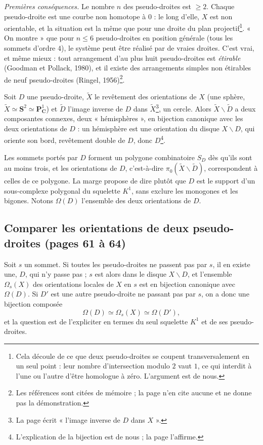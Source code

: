 \documentclass[11pt,a4paper]{article}
\begin{document}
\emph{Premières conséquences.} Le nombre $n$ des pseudo-droites est
$\geqslant 2$. Chaque pseudo-droite est une courbe non homotope à $0$ : le
long d'elle, $X$ est non orientable, et la situation est la même que pour
une droite du plan projectif\footnote{Cela découle de ce que deux
pseudo-droites se coupent transversalement en un seul point : leur nombre
d'intersection modulo $2$ vaut $1$, ce qui interdit à l'une ou l'autre
d'être homologue à zéro. L'argument est de nous.}. « On montre » que pour
$n \leqslant 6$ pseudo-droites en position générale (tous les sommets d'ordre
$4$), le système peut être réalisé par de vraies droites. C'est vrai, et
même mieux : tout arrangement d'au plus huit pseudo-droites est
\emph{étirable} (Goodman et Pollack, 1980), et il existe des arrangements
simples non étirables de neuf pseudo-droites (Ringel, 1956)\footnote{Les
références sont citées de mémoire ; la page n'en cite aucune et ne donne pas
la démonstration.}.

Soit $D$ une pseudo-droite, $\widetilde{X}$ le revêtement des orientations de
$X$ (une sphère, $\widetilde{X} \simeq \mathbf{S}^2 \simeq
\mathbf{P}^1_{\mathbf{C}}$) et $\widetilde{D}$ l'image inverse de $D$ dans
$\widetilde{X}$\footnote{La page écrit « l'image inverse de $D$ dans $X$ ».},
un cercle. Alors $\widetilde{X} \smallsetminus \widetilde{D}$ a deux composantes
connexes, deux « hémisphères », en bijection canonique avec les deux
orientations de $D$ : un hémisphère est une orientation du disque $X
\smallsetminus D$, qui oriente son bord, revêtement double de $D$, donc
$D$\footnote{L'explication de la bijection est de nous ; la page l'affirme.}.

Les sommets portés par $D$ forment un polygone combinatoire $S_D$ dès qu'ils
sont au moins trois, et les orientations de $D$, c'est-à-dire
$\pi_0(\widetilde{X} \smallsetminus \widetilde{D})$, correspondent à celles de
ce polygone. La marge propose de dire plutôt que $D$ est le support d'un
sous-complexe polygonal du squelette $K^1$, sans exclure les monogones et les
bigones. Notons $\Omega(D)$ l'ensemble des deux orientations de $D$.

\subsection*{Comparer les orientations de deux pseudo-droites (pages 61 à 64)}

Soit $s$ un sommet. Si toutes les pseudo-droites ne passent pas par $s$, il
en existe une, $D$, qui n'y passe pas ; $s$ est alors dans le disque $X
\smallsetminus D$, et l'ensemble $\Omega_s(X)$ des orientations locales de $X$
en $s$ est en bijection canonique avec $\Omega(D)$. Si $D'$ est une autre
pseudo-droite ne passant pas par $s$, on a donc une bijection composée
\[
\Omega(D) \simeq \Omega_s(X) \simeq \Omega(D'),
\]
et la question est de l'expliciter en termes du seul squelette $K^1$ et de
ses pseudo-droites.
\end{document}
